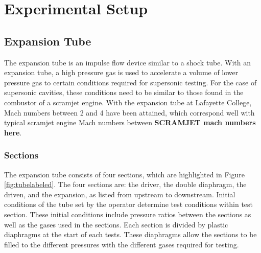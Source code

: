 
\chapter{Experimental Setup} %

\label{Chapter3} %



\section{Expansion Tube}

The expansion tube is an impulse flow device similar to a shock tube. With an expansion tube, a high pressure gas is used to accelerate a volume of lower pressure gas to certain conditions required for supersonic testing. For the case of supersonic cavities, these conditions need to be similar to those found in the combustor of a scramjet engine. With the expansion tube at Lafayette College, Mach numbers between 2 and 4 have been attained, which correspond well with typical scramjet engine Mach numbers between \textbf{SCRAMJET mach numbers here}.

\subsection{Sections}

The expansion tube consists of four sections, which are highlighted in Figure \ref{fig:tubelabeled}. The four sections are: the driver, the double diaphragm, the driven, and the expansion, as listed from upstream to downstream. Initial conditions of the tube set by the operator determine test conditions within test section. These initial conditions include pressure ratios between the sections as well as the gases used in the sections. Each section is divided by plastic diaphragms at the start of each tests. These diaphragms allow the sections to be filled to the different pressures with the different gases required for testing.

